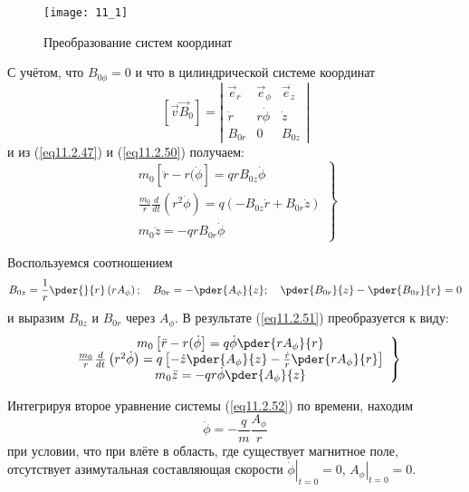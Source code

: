 \begin{figure}[h!]
	\center
	\texttt{[image: 11\_1]}
	\caption{Преобразование систем координат}
	\label{img11.1}
\end{figure}

С учётом, что \( B_{0\phi} = 0 \) и что в цилиндрической системе координат 
\[
	[\vec{v}\vec{B}_0] = \left|
	\begin{array}{ccc}
		\vec{e}_r & \vec{e}_\phi & \vec{e}_z \\
		\dot{r}   & r\dot{\phi}  & \dot{z}   \\
		B_{0r}    & 0            & B_{0z}
	\end{array} \right|
\]
и из (\ref{eq11.2.47}) и (\ref{eq11.2.50}) получаем:
\begin{equation}
	\left. \begin{array}{c}
		m_0 \left[ \ddot{r} - r(\dot{\phi} \right] = qrB_{0z}\dot{\phi} \\
		\frac{m_0}{r}\frac{d}{dt}\left( r^2\dot{\phi} \right) = 
			q\left( -B_{0z}\dot{r} + B_{0r}\dot{z} \right) \\
		m_0 \ddot{z} = -qrB_{0r}\dot{\phi}
	\end{array} \right\}
	\label{eq11.2.51}
\end{equation}

Воспользуемся соотношением
\[
	B_{0z} = \frac{1}{r}\pder{}{r}\left( rA_\phi \right);\quad
	B_{0r} = -\pder{A_\phi}{z};\quad
	\pder{B_{0r}}{z} - \pder{B_{0z}}{r} = 0
\]
и выразим \( B_{0z} \) и \( B_{0r} \) через \( A_\phi \). В результате 
(\ref{eq11.2.51}) преобразуется к виду:
\begin{equation}
	\left. \begin{array}{c}
		m_0 \left[ \ddot{r} - r(\dot{\phi} \right] = 
			q\dot{\phi}\pder{rA_\phi}{r} \\
		\frac{m_0}{r}\frac{d}{dt}\left( r^2\dot{\phi} \right) = 
			q\left[ -\dot{z}\pder{A_\phi}{z} - 
			\frac{\dot{r}}{r}\pder{rA_\phi}{r} \right] \\
		m_0 \ddot{z} = -qr\dot{\phi}\pder{A_\phi}{z}
	\end{array} \right\}
	\label{eq11.2.52}
\end{equation}

Интегрируя второе уравнение системы (\ref{eq11.2.52}) по времени, находим
\begin{equation}
	\dot{\phi} = -\frac{q}{m}\frac{A_\phi}{r}
	\label{eq11.2.53}
\end{equation}
при условии, что при влёте в область, где существует магнитное поле, 
отсутствует азимутальная составляющая скорости 
\( \left. \dot{\phi} \right|_{t=0} = 0 \), 
\( \left. A_\phi \right|_{t=0} = 0 \).

